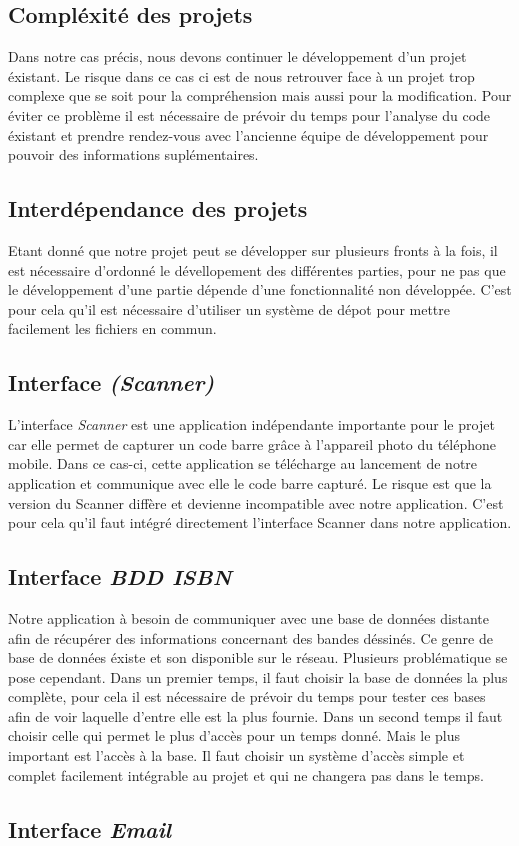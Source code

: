 \documentclass[etudiants]{support-iutrs}
\begin{document}
\subsection{Compléxité des projets}

Dans notre cas précis, nous devons continuer le développement d'un projet éxistant. Le risque dans ce cas ci est de nous retrouver face à un projet trop complexe que se soit pour la compréhension mais aussi pour la modification. Pour éviter ce problème il est nécessaire de prévoir du temps pour l'analyse du code éxistant et prendre rendez-vous avec l'ancienne équipe de développement pour pouvoir des informations suplémentaires. 

\subsection{Interdépendance des projets}

Etant donné que notre projet peut se développer sur plusieurs fronts à la fois, il est nécessaire d'ordonné le dévellopement des différentes parties, pour ne pas que le développement d'une partie dépende d'une fonctionnalité non développée. C'est pour cela qu'il est nécessaire d'utiliser un système de dépot pour mettre facilement les fichiers en commun.

\subsection{Interface \emph{(Scanner)}}

L'interface \emph{Scanner} est une application indépendante importante pour le projet car elle permet de capturer un code barre grâce à l'appareil photo du téléphone mobile. Dans ce cas-ci, cette application se télécharge au lancement de notre application et communique avec elle le code barre capturé. Le risque est que la version du Scanner diffère et devienne incompatible avec notre application. C'est pour cela qu'il faut intégré directement l'interface Scanner dans notre application.

\subsection{Interface \emph{BDD ISBN}}

Notre application à besoin de communiquer avec une base de données distante afin de récupérer des informations concernant des bandes déssinés. Ce genre de base de données éxiste et son disponible sur le réseau. Plusieurs problématique se pose cependant. Dans un premier temps, il faut choisir la base de données la plus complète, pour cela il est nécessaire de prévoir du temps pour tester ces bases afin de voir laquelle d'entre elle est la plus fournie. Dans un second temps il faut choisir celle qui permet le plus d'accès pour un temps donné. Mais le plus important est l'accès à la base. Il faut choisir un système d'accès simple et complet facilement intégrable au projet et qui ne changera pas dans le temps.

\subsection{Interface \emph{Email}}
\end{document}
